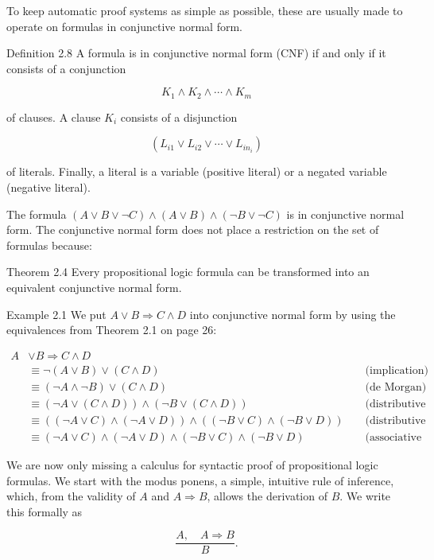 \documentclass[10pt]{book}
\begin{document}
To keep automatic proof systems as simple as possible, these are usually made to operate on formulas in conjunctive normal form.

Definition 2.8 A formula is in conjunctive normal form (CNF) if and only if it consists of a conjunction

$$
K_{1} \wedge K_{2} \wedge \cdots \wedge K_{m}
$$

of clauses. A clause $K_{i}$ consists of a disjunction

$$
\left(L_{i 1} \vee L_{i 2} \vee \cdots \vee L_{i n_{i}}\right)
$$

of literals. Finally, a literal is a variable (positive literal) or a negated variable (negative literal).

The formula $(A \vee B \vee \neg C) \wedge(A \vee B) \wedge(\neg B \vee \neg C)$ is in conjunctive normal form. The conjunctive normal form does not place a restriction on the set of formulas because:

Theorem 2.4 Every propositional logic formula can be transformed into an equivalent conjunctive normal form.

Example 2.1 We put $A \vee B \Rightarrow C \wedge D$ into conjunctive normal form by using the equivalences from Theorem 2.1 on page 26:

$$
\begin{aligned}
A & \vee B \Rightarrow C \wedge D & & \\
& \equiv \neg(A \vee B) \vee(C \wedge D) & & \text { (implication) } \\
& \equiv(\neg A \wedge \neg B) \vee(C \wedge D) & & \text { (de Morgan) } \\
& \equiv(\neg A \vee(C \wedge D)) \wedge(\neg B \vee(C \wedge D)) & & \text { (distributive law) } \\
& \equiv((\neg A \vee C) \wedge(\neg A \vee D)) \wedge((\neg B \vee C) \wedge(\neg B \vee D)) & & \text { (distributive law) } \\
& \equiv(\neg A \vee C) \wedge(\neg A \vee D) \wedge(\neg B \vee C) \wedge(\neg B \vee D) & & \text { (associative law) }
\end{aligned}
$$

We are now only missing a calculus for syntactic proof of propositional logic formulas. We start with the modus ponens, a simple, intuitive rule of inference, which, from the validity of $A$ and $A \Rightarrow B$, allows the derivation of $B$. We write this formally as

$$
\frac{A, \quad A \Rightarrow B}{B} .
$$
\end{document}
